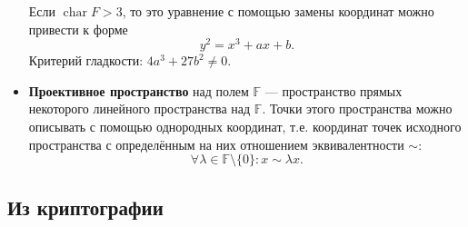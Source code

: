 \documentclass[a4paper,14pt]{extarticle}
\DeclareMathOperator{\chr}{char}
\begin{document}
\begin{itemize}
        Если $\chr F > 3$, то это уравнение с помощью замены
        координат можно привести к форме
        \[
            y^2 = x^3 + a x + b.
        \]
        Критерий гладкости: $4 a^3 + 27 b^2 \ne 0$.
    \item \textbf{Проективное пространство} над полем $\mathbb{F}$ ---
        пространство прямых некоторого линейного пространства над $\mathbb{F}$.
        Точки этого пространства можно описывать с помощью однородных координат,
        т.е. координат точек исходного пространства с определённым на них
        отношением эквивалентности $\sim$:
        \[
            \forall \lambda \in \mathbb{F} \setminus \{0\}: x \sim \lambda x.
        \]
\end{itemize}

\newpage

\subsection{Из криптографии}
\end{document}
